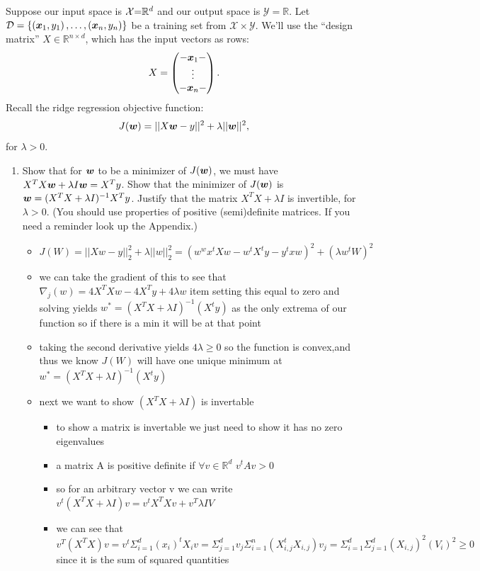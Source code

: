 \documentclass{article}
\theoremstyle{plain}
\theoremstyle{definition}
\begin{document}
Suppose our input space is $\mbox{\ensuremath{\mathcal{X}}=}\mathbb{R}^{d}$ and
our output space is $\mathcal{Y}=\mathbb{R}$. Let $\mathcal{D}=\left\{ \left(\boldsymbol{x}_{1},y_{1}\right),\ldots,\left(\boldsymbol{x}_{n},y_{n}\right)\right\} $
be a training set from $\mathcal{X}\times\mathcal{Y}$. We'll use the ``design matrix''
$X\in\mathbb{R}^{n\times d}$, which has the input vectors as rows: 
\[
X=\begin{pmatrix}-\boldsymbol{x}_{1}-\\
\vdots\\
-\boldsymbol{x}_{n}-
\end{pmatrix}.
\]
Recall the ridge regression objective function:
\[
J(\boldsymbol{w})=||X\boldsymbol{w}-y||^{2}+\lambda||\boldsymbol{w}||^{2},
\]
for $\lambda>0$.
\begin{enumerate}
  \setcounter{enumi}{\value{saveenum}}
\item Show that for $\boldsymbol{w}$ to be a minimizer of $J(\boldsymbol{w})$, we must have $X^{T}X\boldsymbol{w}+\lambda I\boldsymbol{w}=X^{T}y$.
Show that the minimizer of $J(\boldsymbol{w})$ is $\boldsymbol{w}=(X^{T}X+\lambda I)^{-1}X^{T}y$.
Justify that the matrix $X^{T}X+\lambda I$ is invertible, for $\lambda>0$.
(You should use properties of positive (semi)definite matrices. If you need a reminder look up the Appendix.) \\
\begin{itemize}
    \color{blue}
    \item $J(W)=||Xw-y||_{2}^2+\lambda||w||_{2}^2=(w^wx^tXw-w^tX^ty-y^txw)^2+(\lambda w^tW)^2$
    \item we can take the gradient of this to see that $\nabla_{j}(w)=4X^TXw-4X^Ty+4\lambda w$ item setting this equal to zero and solving yields $w^{*}=(X^TX+\lambda I)^{-1}(X^ty)$ as the only extrema of our function so if there is a min it will be at that point 
    \item taking the second derivative yields $4\lambda\geq 0$ so the function is convex,and thus we know $J(W)$ will have one unique minimum at $w^{*}=(X^TX+\lambda I)^{-1}(X^ty)$ 
    \item next we want to show $(X^TX+\lambda I)$ is invertable 
    \begin{itemize}
        \item to show a  matrix is invertable we just need to show it has no zero eigenvalues 
        \item a matrix A is positive definite if $\forall v\in \mathbb{R}^{d} $ $v^tAv>0$
        \item so for an arbitrary vector v we can write $v^t(X^TX+\lambda I)v=v^{t}X^TXv+v^T\lambda I V$
        \item we can see that $v^T(X^TX)v=v^t\Sigma_{i=1}^{d}(x_i)^{t}X_iv=\Sigma_{j=1}^{d}v_j\Sigma_{i=1}^{n}(X^{t}_{i,j}X_{i,j})v_j=\Sigma_{i=1}^{d}\Sigma_{j=1}^{d}(X_{i,j})^2(V_i)^2\geq 0$ since it is the sum of squared quantities 

\end{itemize}
\end{itemize}
\end{enumerate}
\end{document}

